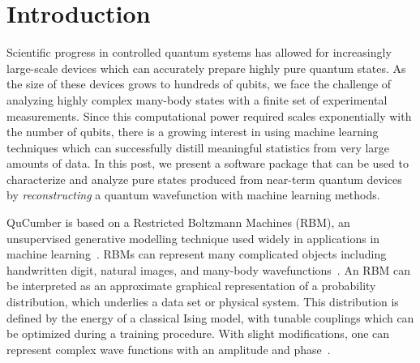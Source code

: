 \documentclass[submission, Phys]{SciPost}
\begin{document}
\section{Introduction}

Scientific progress in controlled quantum systems has allowed for increasingly large-scale devices which can accurately prepare highly pure quantum states.
As the size of these devices grows to hundreds of qubits, we face the challenge of analyzing highly complex many-body states with a finite set of experimental measurements.
Since this computational power required scales exponentially with the number of qubits, there is a growing interest in using machine learning techniques which can successfully distill meaningful statistics from very large amounts of data.
In this post, we present a software package that can be used to characterize and analyze pure states produced from near-term 
quantum devices by {\it reconstructing} a quantum wavefunction with machine learning methods.

QuCumber is based on a Restricted Boltzmann Machines (RBM), an unsupervised generative modelling technique 
used widely in applications in machine learning~\cite{Smolensky}.
RBMs can represent many complicated objects including handwritten digit, natural images, and many-body wavefunctions~\cite{Torlai2016thermo, CarleoTroyer2017Science, ChenWang2018, GlasserCirac2018}.
An RBM can be interpreted as an approximate graphical representation of a probability distribution, which underlies 
a data set or physical system.
This distribution is defined by the energy of a classical Ising model, with tunable couplings which can be optimized during a training procedure.
With slight modifications, one can represent complex wave functions with an amplitude and phase~\cite{torlai2018tomography}.
\end{document}
